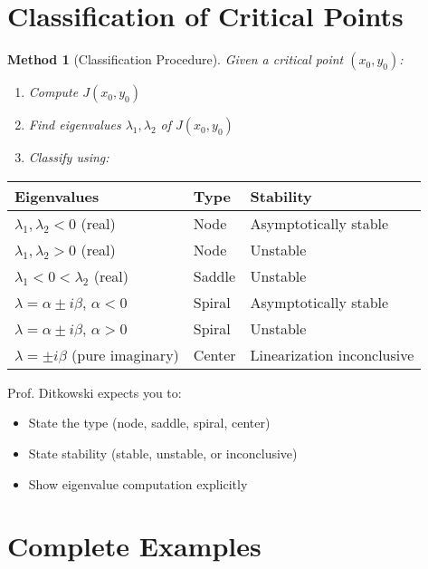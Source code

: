 \documentclass[12pt]{article}
\newtheorem{method}{Method}
\begin{document}
\section{Classification of Critical Points}

\begin{method}[Classification Procedure]
Given a critical point $(x_0, y_0)$:
\begin{enumerate}
    \item Compute $J(x_0, y_0)$
    \item Find eigenvalues $\lambda_1, \lambda_2$ of $J(x_0, y_0)$
    \item Classify using:
\end{enumerate}
\end{method}

\begin{center}
\begin{tabular}{|l|l|l|}
\hline
\textbf{Eigenvalues} & \textbf{Type} & \textbf{Stability} \\
\hline
$\lambda_1, \lambda_2 < 0$ (real) & Node & Asymptotically stable \\
$\lambda_1, \lambda_2 > 0$ (real) & Node & Unstable \\
$\lambda_1 < 0 < \lambda_2$ (real) & Saddle & Unstable \\
$\lambda = \alpha \pm i\beta$, $\alpha < 0$ & Spiral & Asymptotically stable \\
$\lambda = \alpha \pm i\beta$, $\alpha > 0$ & Spiral & Unstable \\
$\lambda = \pm i\beta$ (pure imaginary) & Center & Linearization inconclusive \\
\hline
\end{tabular}
\end{center}

\begin{examtip}
Prof. Ditkowski expects you to:
\begin{itemize}
    \item State the type (node, saddle, spiral, center)
    \item State stability (stable, unstable, or inconclusive)
    \item Show eigenvalue computation explicitly
\end{itemize}
\end{examtip}

\section{Complete Examples}
\end{document}

